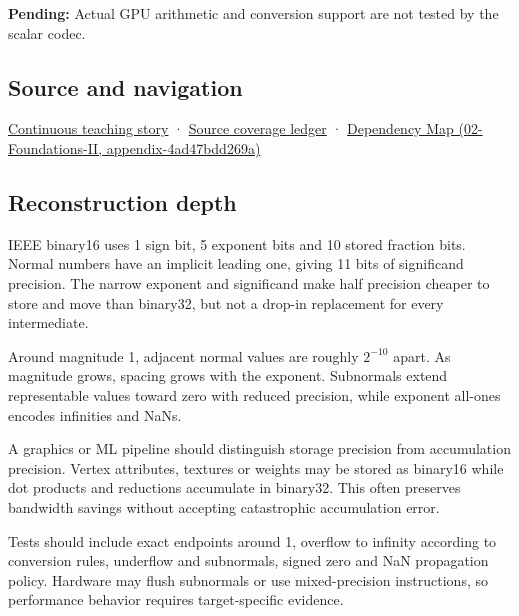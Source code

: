 \textbf{Pending:} Actual GPU arithmetic and conversion support are not tested by the scalar codec.

\subsection{Source and navigation}\label{appendix-34443cec7170-source-and-navigation}

\hyperref[01-foundations-i-ch001-choosing-what-information-to-keep]{Continuous teaching story} · \hyperref[appendix-fd090d982a15]{Source coverage ledger} · \href{../02-Foundations-II/main.pdf\#nameddest=appendix-4ad47bdd269a}{Dependency Map (02-Foundations-II, appendix-4ad47bdd269a)}

\subsection{Reconstruction depth}\label{appendix-34443cec7170-reconstruction-depth}

IEEE binary16 uses 1 sign bit, 5 exponent bits and 10 stored fraction bits. Normal numbers have an implicit leading one, giving 11 bits of significand precision. The narrow exponent and significand make half precision cheaper to store and move than binary32, but not a drop-in replacement for every intermediate.

Around magnitude 1, adjacent normal values are roughly \(2^{-10}\) apart. As magnitude grows, spacing grows with the exponent. Subnormals extend representable values toward zero with reduced precision, while exponent all-ones encodes infinities and NaNs.

A graphics or ML pipeline should distinguish storage precision from accumulation precision. Vertex attributes, textures or weights may be stored as binary16 while dot products and reductions accumulate in binary32. This often preserves bandwidth savings without accepting catastrophic accumulation error.

Tests should include exact endpoints around 1, overflow to infinity according to conversion rules, underflow and subnormals, signed zero and NaN propagation policy. Hardware may flush subnormals or use mixed-precision instructions, so performance behavior requires target-specific evidence.
